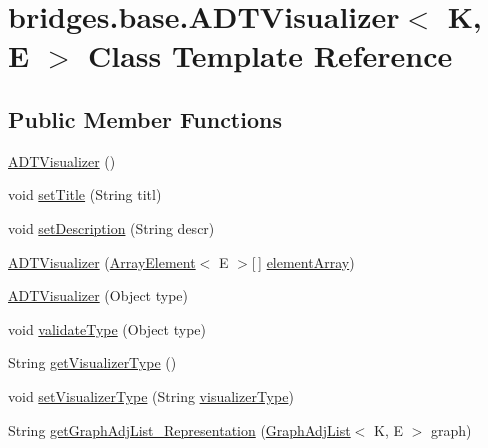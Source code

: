 \hypertarget{classbridges_1_1base_1_1_a_d_t_visualizer}{}\section{bridges.\+base.\+A\+D\+T\+Visualizer$<$ K, E $>$ Class Template Reference}
\label{classbridges_1_1base_1_1_a_d_t_visualizer}
\subsection*{Public Member Functions}
\begin{DoxyCompactItemize}
\item 
\hyperlink{classbridges_1_1base_1_1_a_d_t_visualizer_a3d5098e4c0609c19a547f19f0d538eeb}{A\+D\+T\+Visualizer} ()
\item 
void \hyperlink{classbridges_1_1base_1_1_a_d_t_visualizer_ab0fda74356fefe16f5b3b98a5fce1f9e}{set\+Title} (String titl)
\item 
void \hyperlink{classbridges_1_1base_1_1_a_d_t_visualizer_ab00d1c82e11326ce68c0146bc393c4b1}{set\+Description} (String descr)
\item 
\hyperlink{classbridges_1_1base_1_1_a_d_t_visualizer_acd2d6c0459173578f4fd95ac4d05cd10}{A\+D\+T\+Visualizer} (\hyperlink{classbridges_1_1base_1_1_array_element}{Array\+Element}$<$ E $>$\mbox{[}$\,$\mbox{]} \hyperlink{classbridges_1_1base_1_1_a_d_t_visualizer_a320739b4be463d3987b3de2463b0d592}{element\+Array})
\item 
\hyperlink{classbridges_1_1base_1_1_a_d_t_visualizer_af722d7ea9506b1ca8119ae39c43130ff}{A\+D\+T\+Visualizer} (Object type)
\item 
void \hyperlink{classbridges_1_1base_1_1_a_d_t_visualizer_a991fc08ab102bc0f861e0aefe75282e7}{validate\+Type} (Object type)
\item 
String \hyperlink{classbridges_1_1base_1_1_a_d_t_visualizer_aea37161ff4b74fbeae6f478b4c2e1a50}{get\+Visualizer\+Type} ()
\item 
void \hyperlink{classbridges_1_1base_1_1_a_d_t_visualizer_a5f423ff4295f3ae4371c86d4ab45638c}{set\+Visualizer\+Type} (String \hyperlink{classbridges_1_1base_1_1_a_d_t_visualizer_a288aece657b5641f48e839b34f3884b9}{visualizer\+Type})
\item 
String \hyperlink{classbridges_1_1base_1_1_a_d_t_visualizer_a0b923e3a1afd3d56b5c42ef39e4c5542}{get\+Graph\+Adj\+List\+\_\+\+Representation} (\hyperlink{classbridges_1_1base_1_1_graph_adj_list}{Graph\+Adj\+List}$<$ K, E $>$ graph)

\end{DoxyCompactItemize}
